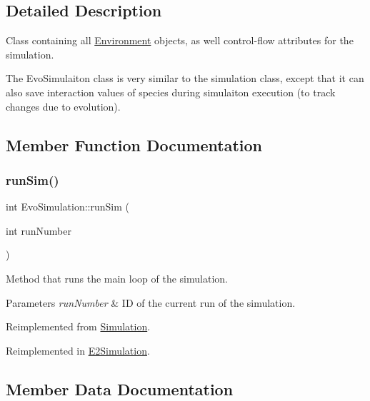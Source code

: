 \subsection{Detailed Description}
Class containing all \hyperlink{classEnvironment}{Environment} objects, as well control-\/flow attributes for the simulation. 

The Evo\+Simulaiton class is very similar to the simulation class, except that it can also save interaction values of species during simulaiton execution (to track changes due to evolution). 

\subsection{Member Function Documentation}
\hypertarget{classEvoSimulation_aa43aa351dec24c638e56995a67a4f0f5}{}\label{classEvoSimulation_aa43aa351dec24c638e56995a67a4f0f5} 
\subsubsection{\texorpdfstring{run\+Sim()}{runSim()}}
{\footnotesize\ttfamily int Evo\+Simulation\+::run\+Sim (\begin{DoxyParamCaption}\item[{int}]{run\+Number }\end{DoxyParamCaption})\hspace{0.3cm}{\ttfamily [virtual]}}



Method that runs the main loop of the simulation. 


\begin{DoxyParams}{Parameters}
{\em run\+Number} & ID of the current run of the simulation. \\
\hline
\end{DoxyParams}


Reimplemented from \hyperlink{classSimulation_a7eb16da89581b496d33b77efbb63b9cd}{Simulation}.



Reimplemented in \hyperlink{classE2Simulation_a28028881fd443d2445b562512cb2169c}{E2\+Simulation}.



\subsection{Member Data Documentation}
\hypertarget{classEvoSimulation_aced0330991a4c4ed3bf726e5909fbd31}{}\label{classEvoSimulation_aced0330991a4c4ed3bf726e5909fbd31} 

